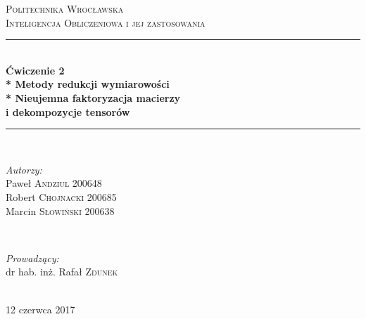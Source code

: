 \begin{titlepage}

\newcommand{\HRule}{\rule{\linewidth}{0.5mm}} 
\center 

\textsc{\LARGE Politechnika Wrocławska}\\[1.5cm] 
\textsc{\Large Inteligencja Obliczeniowa i jej zastosowania}\\[0.5cm] 
\HRule \\[0.5cm]
{ \huge \bfseries Ćwiczenie 2 \\*
	Metody redukcji wymiarowości \\*
	Nieujemna faktoryzacja macierzy \\i dekompozycje tensorów}\\[0.5cm] 
\HRule \\[1.6cm]
 
\begin{minipage}{0.4\textwidth}
\begin{flushleft} \large
\emph{Autorzy:}\\
Paweł  \textsc{Andziul} 200648 \\
Robert  \textsc{Chojnacki} 200685 \\
Marcin  \textsc{Słowiński} 200638 \\
\end{flushleft}
\end{minipage}
~
\begin{minipage}{0.4\textwidth}
\begin{flushright} \large
\emph{Prowadzący:} \\
dr hab. inż. Rafał \textsc{Zdunek}
\end{flushright}
\end{minipage}\\[4cm]

\vfill 
{\large 12 czerwca 2017}\\[3cm] 

\end{titlepage}